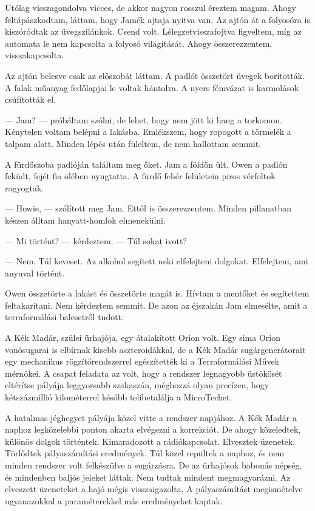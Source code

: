 \documentclass[10pt]{memoir}
\begin{document}
Utólag visszagondolva vicces, de akkor nagyon rosszul éreztem magam. Ahogy
feltápászkodtam, láttam, hogy Jamék ajtaja nyitva van. Az ajtón át a folyosóra
is kiszóródtak az üvegszilánkok. Csend volt. Lélegzetvisszafojtva figyeltem,
míg az automata le nem kapcsolta a folyosó világítását. Ahogy összerezzentem,
visszakapcsolta.

Az ajtón belesve csak az előszobát láttam. A padlót összetört üvegek
borították. A falak műanyag fedőlapjai le voltak hántolva. A nyers fémvázat is
karmolások csúfították el.

— Jam? — próbáltam szólni, de lehet, hogy nem jött ki hang a torkomon.
Kénytelen voltam belépni a lakásba. Emlékszem, hogy ropogott a törmelék a
talpam alatt. Minden lépés után füleltem, de nem hallottam semmit.

A fürdőszoba padlóján találtam meg őket. Jam a földön ült. Owen a padlón
feküdt, fejét fia ölében nyugtatta. A fürdő fehér felületein piros vérfoltok
ragyogtak.

— Howie, — szólított meg Jam. Ettől is összerezzentem. Minden pillanatban
készen álltam hanyatt-homlok elmenekülni.

— Mi történt? — kérdeztem. — Túl sokat ivott?

— Nem. Túl keveset. Az alkohol segített neki elfelejteni dolgokat. Elfelejteni,
ami anyuval történt.

Owen összetörte a lakást és összetörte magát is. Hívtam a mentőket és
segítettem feltakarítani. Nem kérdeztem semmit. De azon az éjszakán Jam
elmesélte, amit a terraformálási balesetről tudott.

A Kék Madár, szülei űrhajója, egy átalakított Orion volt. Egy sima Orion
vonósugarai is elbírnak kisebb aszteroidákkal, de a Kék Madár sugárgenerátorait
egy mechanikus rögzítőrendszerrel egészítették ki a Terraformálási Művek
mérnökei. A csapat feladata az volt, hogy a rendszer legnagyobb üstökösét
eltérítse pályája leggyorsabb szakaszán, méghozzá olyan precízen, hogy
kétszázmillió kilométerrel később telibetalálja a MicroTechet.

A hatalmas jéghegyet pályája közel vitte a rendszer napjához. A Kék Madár a
naphoz legközelebbi ponton akarta elvégezni a korrekciót. De ahogy közeledtek,
különös dolgok történtek. Kimaradozott a rádiókapcsolat. Elvesztek üzenetek.
Törlődtek pályaszámítási eredmények. Túl közel repültek a naphoz, és nem minden
rendszer volt felkészülve a sugárzásra. De az űrhajósok babonás népség, és
mindenben baljós jeleket láttak. Nem tudtak mindent megmagyarázni. Az elveszett
üzeneteket a hajó mégis visszaigazolta. A pályaszámítást megismételve
ugyanazokkal a paraméterekkel más eredményeket kaptak.
\end{document}
